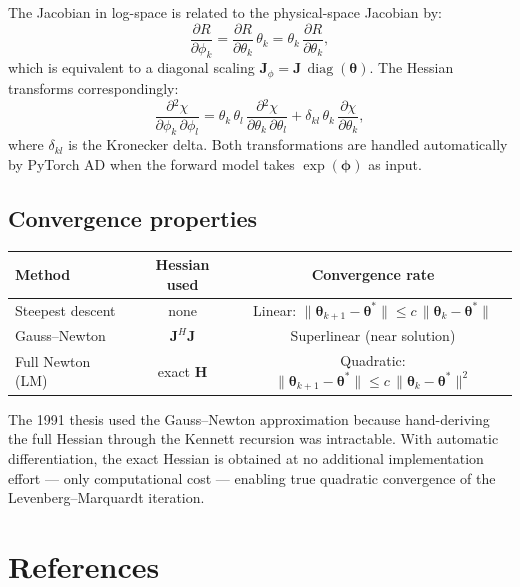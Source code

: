 \documentclass[11pt,a4paper]{article}
\newcommand{\ppd}[2]{\frac{\partial #1}{\partial #2}}
\theoremstyle{plain}
\theoremstyle{remark}
\begin{document}
The Jacobian in log-space is related to the physical-space Jacobian by:
\begin{equation}\label{eq:log-jac}
  \ppd{R}{\phi_k}
  = \ppd{R}{\theta_k}\,\theta_k
  = \theta_k\,\ppd{R}{\theta_k},
\end{equation}
which is equivalent to a diagonal scaling $\mathbf{J}_\phi
= \mathbf{J}\,\operatorname{diag}(\bm{\theta})$.  The
Hessian transforms correspondingly:
\begin{equation}\label{eq:log-hess}
  \ppd{{}^2\chi}{\phi_k\,\partial\phi_l}
  = \theta_k\,\theta_l\,\ppd{{}^2\chi}{\theta_k\,\partial\theta_l}
  + \delta_{kl}\,\theta_k\,\ppd{\chi}{\theta_k},
\end{equation}
where $\delta_{kl}$ is the Kronecker delta.  Both transformations are
handled automatically by PyTorch AD when the forward model takes
$\exp(\bm{\phi})$ as input.

\subsection{Convergence properties}\label{sec:convergence}

\begin{center}
\renewcommand{\arraystretch}{1.3}
\begin{tabular}{lcc}
  \toprule
  \textbf{Method} & \textbf{Hessian used} & \textbf{Convergence rate} \\
  \midrule
  Steepest descent & none
    & Linear: $\|\bm{\theta}_{k+1} - \bm{\theta}^*\|
      \leq c\,\|\bm{\theta}_k - \bm{\theta}^*\|$ \\
  Gauss--Newton & $\mathbf{J}^H\mathbf{J}$
    & Superlinear (near solution) \\
  Full Newton (LM) & exact $\mathbf{H}$
    & Quadratic: $\|\bm{\theta}_{k+1} - \bm{\theta}^*\|
      \leq c\,\|\bm{\theta}_k - \bm{\theta}^*\|^2$ \\
  \bottomrule
\end{tabular}
\end{center}

\noindent The 1991 thesis used the Gauss--Newton approximation because
hand-deriving the full Hessian through the Kennett recursion was
intractable.  With automatic differentiation, the exact Hessian is
obtained at no additional implementation effort --- only computational
cost --- enabling true quadratic convergence of the Levenberg--Marquardt
iteration.

\section*{References}
\end{document}
